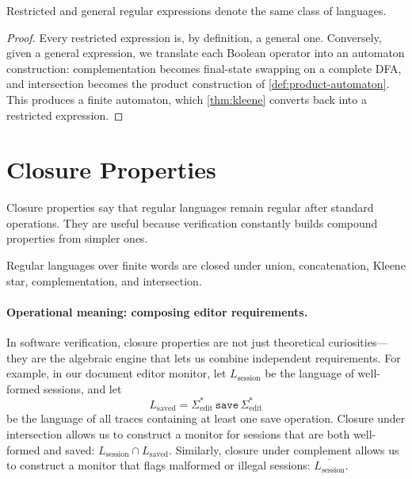 \begin{corollary}
\label{cor:regex-classes}
Restricted and general regular expressions denote the same class of
languages.
\end{corollary}

\begin{proof}
Every restricted expression is, by definition, a general one.  Conversely,
given a general expression, we translate each Boolean operator into an
automaton construction: complementation becomes final-state swapping on
a complete DFA, and intersection becomes the product construction of
\cref{def:product-automaton}.  This produces a finite automaton, which
\cref{thm:kleene} converts back into a restricted expression.
\end{proof}



\section{Closure Properties}
\label{sec:regular-closure}

Closure properties say that regular languages remain regular after
standard operations.  They are useful because verification constantly
builds compound properties from simpler ones.

\begin{theorem}
\label{thm:regular-closure}
Regular languages over finite words are closed under union,
concatenation, Kleene star, complementation, and intersection.
\end{theorem}

\paragraph{Operational meaning: composing editor requirements.}
In software verification, closure properties are not just theoretical curiosities---they are the algebraic engine that lets us combine independent requirements. For example, in our document editor monitor, let $L_{\mathrm{session}}$ be the language of well-formed sessions, and let
\[
  L_{\mathrm{saved}}
  =\Sigma_{\mathrm{edit}}^*\,
   \texttt{save}\,
   \Sigma_{\mathrm{edit}}^*
\]
be the language of all traces containing at least one save operation. Closure under intersection allows us to construct a monitor for sessions that are both well-formed and saved: $L_{\mathrm{session}}\cap L_{\mathrm{saved}}$. Similarly, closure under complement allows us to construct a monitor that flags malformed or illegal sessions: $\overline{L_{\mathrm{session}}}$. 

